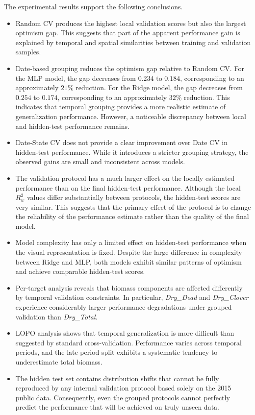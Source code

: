 The experimental results support the following conclusions. 
\begin{itemize} 
\item Random CV produces the highest local validation scores but also the largest optimism gap. This suggests that part of the apparent performance gain is explained by temporal and spatial similarities between training and validation samples. 

\item Date-based grouping reduces the optimism gap relative to Random CV. For the MLP model, the gap decreases from $0.234$ to $0.184$, corresponding to an approximately $21\%$ reduction. For the Ridge model, the gap decreases from $0.254$ to $0.174$, corresponding to an approximately $32\%$ reduction. This indicates that temporal grouping provides a more realistic estimate of generalization performance. However, a noticeable discrepancy between local and hidden-test performance remains. 

\item Date-State CV does not provide a clear improvement over Date CV in hidden-test performance. While it introduces a stricter grouping strategy, the observed gains are small and inconsistent across models. 

\item The validation protocol has a much larger effect on the locally estimated performance than on the final hidden-test performance. Although the local $R^2_w$ values differ substantially between protocols, the hidden-test scores are very similar. This suggests that the primary effect of the protocol is to change the reliability of the performance estimate rather than the quality of the final model. 

\item Model complexity has only a limited effect on hidden-test performance when the visual representation is fixed. Despite the large difference in complexity between Ridge and MLP, both models exhibit similar patterns of optimism and achieve comparable hidden-test scores. 

\item Per-target analysis reveals that biomass components are affected differently by temporal validation constraints. In particular, \textit{Dry\_Dead} and \textit{Dry\_Clover} experience considerably larger performance degradations under grouped validation than \textit{Dry\_Total}. 

\item LOPO analysis shows that temporal generalization is more difficult than suggested by standard cross-validation. Performance varies across temporal periods, and the late-period split exhibits a systematic tendency to underestimate total biomass. 

\item The hidden test set contains distribution shifts that cannot be fully reproduced by any internal validation protocol based solely on the 2015 public data. Consequently, even the grouped protocols cannot perfectly predict the performance that will be achieved on truly unseen data. 
\end{itemize} 

